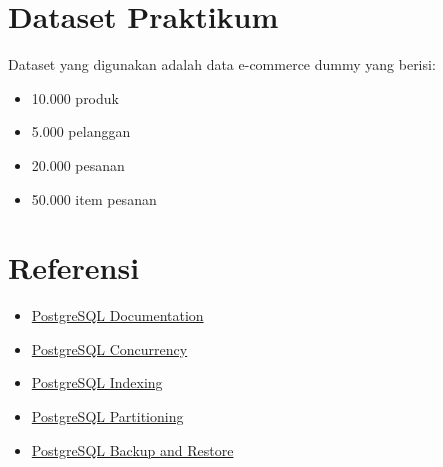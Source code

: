 \section{Dataset Praktikum}

Dataset yang digunakan adalah data e-commerce dummy yang berisi:
\begin{itemize}
    \item 10.000 produk
    \item 5.000 pelanggan
    \item 20.000 pesanan
    \item 50.000 item pesanan
\end{itemize}

\section{Referensi}

\begin{itemize}
    \item \href{https://www.postgresql.org/docs/}{PostgreSQL Documentation}
    \item \href{https://www.postgresql.org/docs/current/mvcc.html}{PostgreSQL Concurrency}
    \item \href{https://www.postgresql.org/docs/current/indexes.html}{PostgreSQL Indexing}
    \item \href{https://www.postgresql.org/docs/current/ddl-partitioning.html}{PostgreSQL Partitioning}
    \item \href{https://www.postgresql.org/docs/current/backup.html}{PostgreSQL Backup and Restore}
\end{itemize}